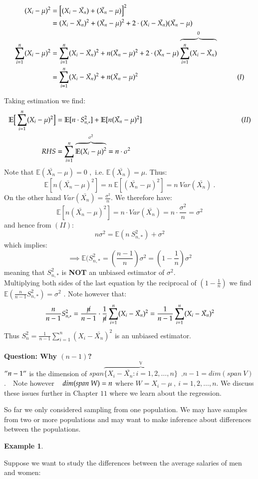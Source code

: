 \documentclass[14pt,twoside,a4paper,fleqn]{article}
\theoremstyle{plain}
\newtheorem{example}{Example}[section]
\begin{document}
\begin{equation*}
\begin{split}
(X_i - \mu)^2 &= \big[(X_i - \bar{X_n})+(\bar{X_n}-\mu)\big]^2\\
	&= (X_i - \bar{X_n})^2 + (\bar{X_n}-\mu)^2 + 2\cdot (X_i - \bar{X_n}) (\bar{X_n}-\mu)\\
\sum_{i=1}^n(X_i -\mu)^2 &= \sum_{i=1}^n (X_i - \bar{X_n})^2 + n(\bar{X_n}-\mu)^2 + 2\cdot (\bar{X_n} - \mu)\overbrace{\sum_{i=1}^{n}(X_i-\bar{X_n})}^{0}\\
	&= \sum_{i=1}^n (X_i - \bar{X_n})^2 + n(\bar{X_n}-\mu)^2\tab[5cm] (I)
\end{split}
\end{equation*}

Taking estimation we find:
\begin{equation*}
\begin{split}
\mathbb{E}\big[\sum_{i=1}^n(X_i - \mu)^2\big] &= \mathbb{E}[n\cdot S_{n,*}^2]+\mathbb{E}[n(\bar{X_n}-\mu)^2]\tab[5cm] (II)\\
	RHS &= \sum_{i=1}^n\overbrace{\mathbb{E}(X_i - \mu)^2}^{\sigma^2} = n\cdot\sigma^2
\end{split}
\end{equation*}
Note that $\mathbb{E}(\bar{X_n}-\mu)=0$ ,\ i.e. $\mathbb{E}(\bar{X_n})=\mu$. Thus:
$$
	\mathbb{E}[n(\bar{X_n}-\mu)^2] = n\ \mathbb{E}[(\bar{X_n}-\mu)^2] = n\ Var(\bar{X_n})\ .
$$
On the other hand $Var(\bar{X_n})=\frac{\sigma^2}{n}$. We therefore have:
$$
	\mathbb{E}[n(\bar{X_n}-\mu)^2] = n\cdot Var(\bar{X_n}) = n\cdot \frac{\sigma^2}{n} = \sigma^2
$$
and hence from $(II)$:
$$
	n\sigma^2 = \mathbb{E}(n\ S_{n,*}^2) + \sigma^2
$$
which implies:
$$
	\implies \mathbb{E}(S_{n,*}^2 = (\frac{n-1}{n})\sigma^2 = (1-\frac{1}{n})\sigma^2
$$
meaning that $S_{n,*}^2$ is \textbf{NOT} an unbiased estimator of $\sigma^2$.\\
Multiplying both sides of the last equation by the reciprocal of $(1-\frac{1}{n})$ we find \mbox{$\mathbb{E}(\frac{n}{n-1}S_{n,*}^2) = \sigma^2$} . Note however that:
$$
\frac{n}{n-1}S_{n,*}^2 = \frac{\cancel{n}}{n-1}\cdot\frac{1}{\cancel{n}}\sum_{i=1}^n (X_i - \bar{X_n})^2 = \frac{1}{n-1}\sum_{i=1}^n (X_i - \bar{X_n})^2
$$
Thus $\boxed{S_n^2 = \frac{1}{n-1}\sum_{i=1}^n(X_i - \bar{X_n})^2}$ is an unbiased estimator.\\ \\
\textbf{Question: Why $(n-1)$?}\\
$"n-1"$ is the dimension of $span\overbrace{\{X_i - \bar{X_n} \colon i=1,2,\ldots,n\}}^{\mathbb{V}}$\ .\newline $n-1 = dim(span\ V)$.\ \ Note however $\tab[0.3cm] dim(span\ W)=n$ where \mbox{$W={X_i-\mu\ ,\ i=1,2,\ldots,n}$}.\newline
We discuss these issues further in Chapter $11$ where we learn about the \mbox{regression}.\par
So far we only considered sampling from one population. We may have samples from two or more populations and may want to make inference about differences between the populations. 
\begin{example}
\end{example}
Suppose we want to study the differences between the average salaries of men and women:
\end{document}
